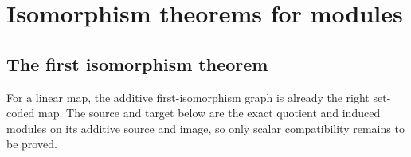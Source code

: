 




\section{Isomorphism theorems for modules}

\subsection{The first isomorphism theorem}

For a linear map, the additive first-isomorphism graph is already the right
set-coded map.  The source and target below are the exact quotient and induced
modules on its additive source and image, so only scalar compatibility remains
to be proved.

